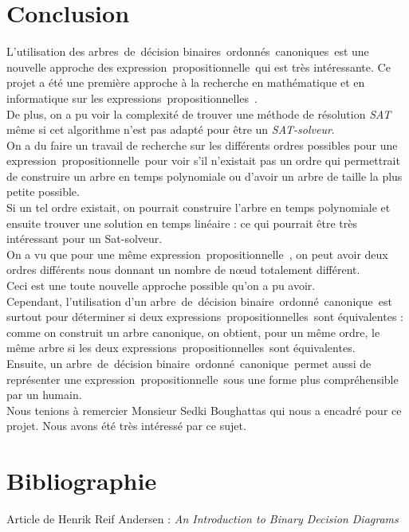 \documentclass[a4paper, oneside]{report}
\newcommand{\adb}{arbre~de~décision binaire~}
\newcommand{\adbs}{arbres~de~décision binaires~}
\newcommand{\adbo}{\adb ordonné~}
\newcommand{\adbos}{\adbs ordonnés~}
\newcommand{\adboc}{\adbo canonique~}
\newcommand{\adbocs}{\adbos canoniques~}
\newcommand{\expp}{expression~propositionnelle~}
\newcommand{\expps}{expressions~propositionnelles~}
\begin{document}
\chapter*{Conclusion}
L'utilisation des \adbocs est une nouvelle approche des \expp qui est très intéressante. Ce projet a été une première approche à la recherche en mathématique et en informatique sur les \expps.\\
De plus, on a pu voir la complexité de trouver une méthode de résolution \textit{SAT} même si cet algorithme n'est pas adapté pour être un \textit{SAT-solveur}.\\
On a du faire un travail de recherche sur les différents ordres possibles pour une \expp pour voir s'il n'existait pas un ordre qui permettrait de construire un arbre en temps polynomiale ou d'avoir un arbre de taille la plus petite possible.\\
Si un tel ordre existait, on pourrait construire l'arbre en temps polynomiale et ensuite trouver une solution en temps linéaire : ce qui pourrait être très intéressant pour un Sat-solveur.\\
On a vu que pour une même \expp, on peut avoir deux ordres différents nous donnant un nombre de nœud totalement différent.\\
Ceci est une toute nouvelle approche possible qu'on a pu avoir.\\
Cependant, l'utilisation d'un \adboc est surtout pour déterminer si deux \expps sont équivalentes : comme on construit un arbre canonique, on obtient, pour un même ordre, le même arbre si les deux \expps sont équivalentes.\\
Ensuite, un \adboc permet aussi de représenter une \expp sous une forme plus compréhensible par un humain.\\
Nous tenions à remercier Monsieur Sedki Boughattas qui nous a encadré pour ce projet. Nous avons été très intéressé par ce sujet.
\chapter*{Bibliographie}
Article de Henrik Reif Andersen : \textit{An Introduction to Binary Decision Diagrams}
\end{document}
